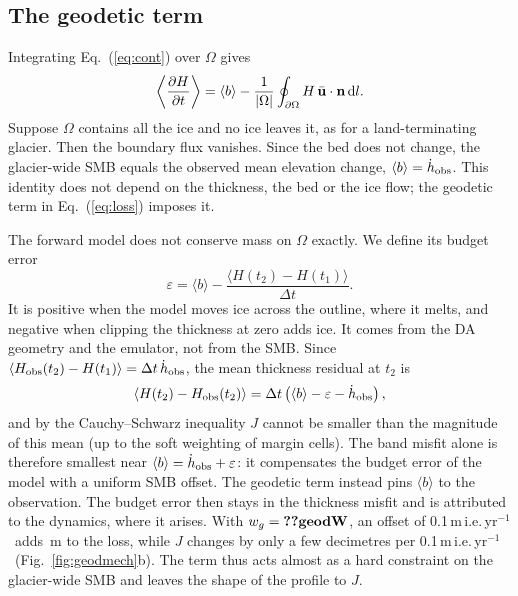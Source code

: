 \documentclass[10pt,a4paper]{article}
\newcommand{\mie}{m\,i.e.\,yr$^{-1}$}
\begin{document}
\subsection{The geodetic term}
\label{sec:geod}
Integrating Eq.~(\ref{eq:cont}) over $\Omega$ gives
\begin{equation}
\left\langle\frac{\partial H}{\partial t}\right\rangle = \langle b\rangle
 - \frac{1}{|\Omega|}\oint_{\partial\Omega} H\,\bar{\mathbf u}\cdot\mathbf n\,{\rm d}l .
\label{eq:budget}
\end{equation}
Suppose $\Omega$ contains all the ice and no ice leaves it, as for a land-terminating glacier. Then the boundary flux
vanishes. Since the bed does not change, the glacier-wide SMB equals the observed mean elevation change,
$\langle b\rangle=\dot h_{\rm obs}$. This identity does not depend on the thickness, the bed or the ice flow; the
geodetic term in Eq.~(\ref{eq:loss}) imposes it.

The forward model does not conserve mass on $\Omega$ exactly. We define its budget error
\begin{equation}
\varepsilon = \langle b\rangle - \frac{\langle H(t_2)-H(t_1)\rangle}{\Delta t}.
\label{eq:eps}
\end{equation}
It is positive when the model moves ice across the outline, where it melts, and negative when clipping the thickness at
zero adds ice. It comes from the DA geometry and the emulator, not from the SMB. Since
$\langle H_{\rm obs}(t_2)-H(t_1)\rangle=\Delta t\,\dot h_{\rm obs}$, the mean thickness residual at $t_2$ is
\begin{equation}
\left\langle H(t_2)-H_{\rm obs}(t_2)\right\rangle = \Delta t\left(\langle b\rangle - \varepsilon - \dot h_{\rm obs}\right),
\label{eq:meanres}
\end{equation}
and by the Cauchy--Schwarz inequality $J$ cannot be smaller than the magnitude of this mean (up to the soft weighting of
margin cells). The band misfit alone is therefore smallest near $\langle b\rangle=\dot h_{\rm obs}+\varepsilon$: it
compensates the budget error of the model with a uniform SMB offset. The geodetic term instead pins $\langle b\rangle$ to
the observation. The budget error then stays in the thickness misfit and is attributed to the dynamics, where it
arises. With $w_g=\V{geodW}$, an offset of 0.1\,\mie\ adds \,m to the loss, while $J$ changes by only a few
decimetres per 0.1\,\mie\ (Fig.~\ref{fig:geodmech}b). The term thus acts almost as a hard constraint on the
glacier-wide SMB and leaves the shape of the profile to $J$.
\end{document}
